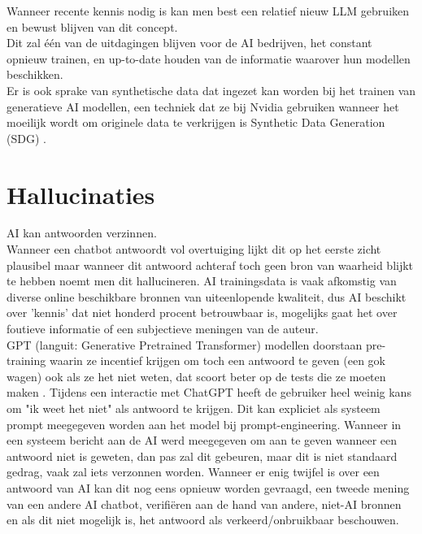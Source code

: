 Wanneer recente kennis nodig is kan men best een relatief nieuw LLM gebruiken en bewust blijven van dit concept. \\

Dit zal één van de uitdagingen blijven voor de AI bedrijven, het constant opnieuw trainen, en up-to-date houden van de informatie waarover hun modellen beschikken. \\

Er is ook sprake van synthetische data dat ingezet kan worden bij het trainen van generatieve AI modellen, een techniek dat ze bij Nvidia gebruiken wanneer het moeilijk wordt om originele data te verkrijgen is Synthetic Data Generation (SDG) \autocite{Nvidia}.

\section{Hallucinaties}
\label{sec:hallucinaties}
AI kan antwoorden verzinnen. \\
Wanneer een chatbot antwoordt vol overtuiging lijkt dit op het eerste zicht plausibel maar wanneer dit antwoord achteraf toch geen bron van waarheid blijkt te hebben noemt men dit hallucineren. 
AI trainingsdata is vaak afkomstig van diverse online beschikbare bronnen van uiteenlopende kwaliteit, dus AI beschikt over 'kennis' dat niet honderd procent betrouwbaar is, mogelijks gaat het over foutieve informatie of een subjectieve meningen van de auteur. \\

GPT (languit: Generative Pretrained Transformer) modellen doorstaan pre-training waarin ze incentief krijgen om toch een antwoord te geven (een gok wagen) ook als ze het niet weten, dat scoort beter op de tests die ze moeten maken \autocite{Varanasi2025}. Tijdens een interactie met ChatGPT heeft de gebruiker heel weinig kans om "ik weet het niet" als antwoord te krijgen. Dit kan expliciet als systeem prompt meegegeven worden aan het model bij prompt-engineering. Wanneer in een systeem bericht aan de AI werd meegegeven om aan te geven wanneer een antwoord niet is geweten, dan pas zal dit gebeuren, maar dit is niet standaard gedrag, vaak zal iets verzonnen worden. Wanneer er enig twijfel is over een antwoord van AI kan dit nog eens opnieuw worden gevraagd, een tweede mening van een andere AI chatbot, verifiëren aan de hand van andere, niet-AI bronnen en als dit niet mogelijk is, het antwoord als verkeerd/onbruikbaar beschouwen.

